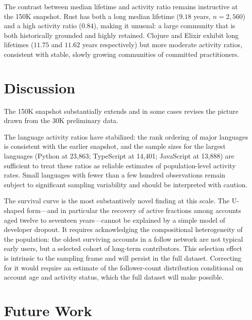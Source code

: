\documentclass[12pt,a4paper]{article}
\begin{document}
The contrast between median lifetime and activity ratio remains instructive at
the 150K snapshot. Rust has both a long median lifetime ($9.18$ years, $n =
2{,}560$) and a high activity ratio ($0.84$), making it unusual: a large
community that is both historically grounded and highly retained. Clojure and
Elixir exhibit long lifetimes ($11.75$ and $11.62$ years respectively) but more
moderate activity ratios, consistent with stable, slowly growing communities of
committed practitioners.

\section{Discussion}

The 150K snapshot substantially extends and in some cases revises the picture
drawn from the 30K preliminary data.

The language activity ratios have stabilized: the rank ordering of major
languages is consistent with the earlier snapshot, and the sample sizes for the
largest languages (Python at 23,863; TypeScript at 14,401; JavaScript at 13,888)
are sufficient to treat these ratios as reliable estimates of population-level
activity rates. Small languages with fewer than a few hundred observations remain
subject to significant sampling variability and should be interpreted with
caution.

The survival curve is the most substantively novel finding at this scale. The
U-shaped form---and in particular the recovery of active fractions among accounts
aged twelve to seventeen years---cannot be explained by a simple model of
developer dropout. It requires acknowledging the compositional heterogeneity of
the population: the oldest surviving accounts in a follow network are not typical
early users, but a selected cohort of long-term contributors. This selection
effect is intrinsic to the sampling frame and will persist in the full dataset.
Correcting for it would require an estimate of the follower-count distribution
conditional on account age and activity status, which the full dataset will
make possible.

\section{Future Work}
\end{document}

